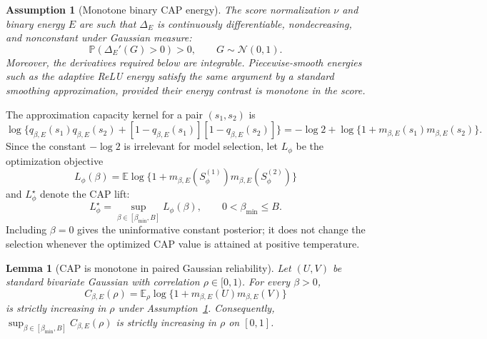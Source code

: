 \documentclass[11pt]{article}
\newtheorem{assumption}{Assumption}
\newtheorem{lemma}{Lemma}
\newcommand{\E}{\mathbb{E}}
\newcommand{\Pbb}{\mathbb{P}}
\newcommand{\Normal}{\mathcal{N}}
\begin{document}
\begin{assumption}[Monotone binary CAP energy]
\label{ass:monotone-energy}
The score normalization \(\nu\) and binary energy \(E\) are such that
\(\Delta_E\) is continuously differentiable, nondecreasing, and nonconstant
under Gaussian measure:
\[
    \Pbb\!\left(\Delta_E'(G)>0\right)>0,
    \qquad G\sim\Normal(0,1).
\]
Moreover, the derivatives required below are integrable. Piecewise-smooth
energies such as the adaptive ReLU energy satisfy the same argument by a
standard smoothing approximation, provided their energy contrast is monotone in
the score.
\end{assumption}

The approximation capacity kernel for a pair \((s_1,s_2)\) is
\[
    \log\{q_{\beta,E}(s_1)q_{\beta,E}(s_2)
    +[1-q_{\beta,E}(s_1)][1-q_{\beta,E}(s_2)]\}
    =
    -\log 2+
    \log\{1+m_{\beta,E}(s_1)m_{\beta,E}(s_2)\}.
\]
Since the constant \(-\log 2\) is irrelevant for model selection, let \(L_\phi\) be the optimization objective
\[
    L_\phi(\beta)
    =
    \E\log\{1+m_{\beta,E}(S_\phi^{(1)})
    m_{\beta,E}(S_\phi^{(2)})\}
\]
and \(L_\phi^\star\) denote the CAP lift:
\[
    L_\phi^\star
    =
    \sup_{\beta\in[\beta_{\min},B]} L_\phi(\beta),
    \qquad 0<\beta_{\min}\le B.
\]
Including \(\beta=0\) gives the uninformative constant posterior; it does not
change the selection whenever the optimized CAP value is attained at positive
temperature.

\begin{lemma}[CAP is monotone in paired Gaussian reliability]
\label{lem:price}
Let \((U,V)\) be standard bivariate Gaussian with correlation \(\rho\in[0,1)\). For every \(\beta>0\),
\[
    C_{\beta,E}(\rho)
    =
    \E_\rho\log\{1+m_{\beta,E}(U)m_{\beta,E}(V)\}
\]
is strictly increasing in \(\rho\) under
Assumption~\ref{ass:monotone-energy}. Consequently,
\(\sup_{\beta\in[\beta_{\min},B]} C_{\beta,E}(\rho)\) is strictly increasing
in \(\rho\) on \([0,1]\).
\end{lemma}
\end{document}
